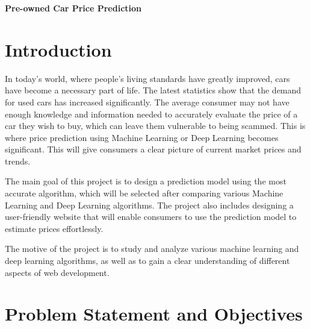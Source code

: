 \documentclass[a4paper,12pt]{article}
\begin{document}
\begin{titlepage}
\begin{center}

    \vspace*{0.1in}

    {\Huge\bfseries Pre-owned Car Price Prediction\par}
    \vspace{1in}
\end{center}

\section*{Introduction}
\begin{justify}

In today's world, where people’s living standards have greatly improved, cars have become a necessary part of life. The latest statistics show that the demand for used cars has increased significantly.  The average consumer may not have enough knowledge and information needed to accurately evaluate the price of a car they wish to buy, which can leave them vulnerable to being scammed. This is where price prediction using Machine Learning or Deep Learning becomes significant. This will give consumers a clear picture of current market prices and trends.  
\newline

The main goal of this project is to design a prediction model using the most accurate algorithm, which will be selected after comparing various Machine Learning and Deep Learning algorithms. The project also includes designing a user-friendly website that will enable consumers to use the prediction model to estimate prices effortlessly.
\newline

The motive of the project is to study and analyze various machine learning and deep learning algorithms, as well as to gain a clear understanding of different aspects of web development.

\end{justify}

\section*{Problem Statement and Objectives}
\begin{justify}


\end{justify}
\end{titlepage}
\end{document}
